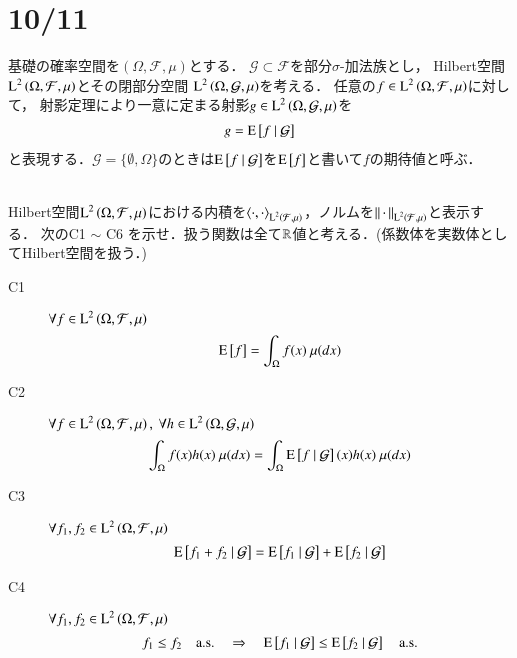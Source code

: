 \section{10/11}
	基礎の確率空間を$(\Omega,\mathcal{F},\mu)$とする．
	$\mathcal{G} \subset \mathcal{F}$を部分$\sigma$-加法族とし，
	Hilbert空間$\operatorname{L}^{2} \left(\Omega,\mathcal{F},\mu\right)$とその閉部分空間
	$\operatorname{L}^{2} \left(\Omega, \mathcal{G},\mu\right)$を考える．
	任意の$f \in \operatorname{L}^{2} \left(\Omega, \mathcal{F},\mu\right)$に対して，
	射影定理により一意に定まる射影$g \in \operatorname{L}^{2} \left(\Omega, \mathcal{G},\mu\right)$を
	\begin{align}
		g = \operatorname{E} \left[ f \ \middle|\ \mathcal{G} \right]
	\end{align}
	と表現する．$\mathcal{G} = \{\emptyset, \Omega\}$のときは$\operatorname{E} \left[ f \ \middle|\ \mathcal{G} \right]$を$\operatorname{E} \left[ f \right]$と書いて$f$の期待値と呼ぶ．
	\begin{qst}\mbox{}\\
		Hilbert空間$\operatorname{L}^{2} \left(\Omega, \mathcal{F},\mu\right)$における内積を$\inprod<\cdot,\cdot>_{\Lp{2}{\mathcal{F},\mu}}$，ノルムを$\left\|\, \cdot\, \right\|_{\operatorname{L}^{2} \left(\mathcal{F},\mu\right)}$と表示する．
		次のC1 $\sim$ C6 を示せ．扱う関数は全て$\mathbb{R}$値と考える．(係数体を実数体としてHilbert空間を扱う．)
		\begin{description}
			\item[C1] $\forall f \in \operatorname{L}^{2} \left(\Omega, \mathcal{F},\mu\right)$
				\begin{align}
					\operatorname{E} \left[ f \right] = \int_{\Omega} f(x)\ \mu(dx)
				\end{align}
				
			\item[C2]	$\forall f \in \operatorname{L}^{2} \left(\Omega, \mathcal{F},\mu\right),\ \forall h \in \operatorname{L}^{2} \left(\Omega, \mathcal{G},\mu\right)$
				\begin{align}
					\int_{\Omega} f(x)h(x)\ \mu(dx) = \int_{\Omega} \operatorname{E} \left[ f \ \middle|\ \mathcal{G} \right](x)h(x)\ \mu(dx)
				\end{align}
				
			\item[C3]	$\forall f_1,f_2 \in \operatorname{L}^{2} \left(\Omega, \mathcal{F},\mu\right)$
				\begin{align}
					\operatorname{E} \left[ f_1 + f_2 \ \middle|\ \mathcal{G} \right] = \operatorname{E} \left[ f_1 \ \middle|\ \mathcal{G} \right] + \operatorname{E} \left[ f_2 \ \middle|\ \mathcal{G} \right]
				\end{align}

			\item[C4]	$\forall f_1,f_2 \in \operatorname{L}^{2} \left(\Omega, \mathcal{F},\mu\right)$
				\begin{align}
					f_1 \leq f_2 \quad \mathrm{a.s.} \quad \Rightarrow \quad \operatorname{E} \left[ f_1 \ \middle|\ \mathcal{G} \right] \leq \operatorname{E} \left[ f_2 \ \middle|\ \mathcal{G} \right] \quad \mathrm{a.s.}
				\end{align}
			

\end{description}
\end{qst}
